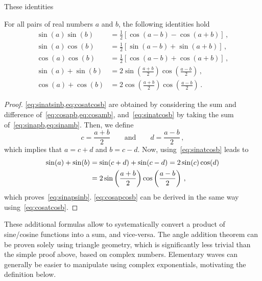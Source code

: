 These identities
\begin{corollary}
  \label{cor:sumproduct}
  For all pairs of real numbers $a$ and $b$, the following identities hold
  \begin{align}
    \sin(a)\sin(b)&=\frac{1}{2}\left[\cos(a-b)-\cos(a+b)\right]\,,
    \label{eq:sinatsinb}\\
    \sin(a)\cos(b)&=\frac{1}{2}\left[\sin(a-b)+\sin(a+b)\right]\,,
    \label{eq:sinatcosb}\\
    \cos(a)\cos(b)&=\frac{1}{2}\left[\cos(a-b)+\cos(a+b)\right]\,,
    \label{eq:cosatcosb}\\
    \sin(a)+\sin(b)&=2\sin\left(\frac{a+b}{2}\right)\cos\left(\frac{a-b}{2}\right)\,,
    \label{eq:sinapsinb}\\
    \cos(a)+\cos(b)&=2\cos\left(\frac{a+b}{2}\right)\cos\left(\frac{a-b}{2}\right)\,.
    \label{eq:cosapcosb}
  \end{align}
\end{corollary}
\begin{proof}
  \cref{eq:sinatsinb,eq:cosatcosb} are obtained by considering the sum and difference of~\cref{eq:cosapb,eq:cosamb}, and~\cref{eq:sinatcosb} by taking the sum of~\cref{eq:sinapb,eq:sinamb}.
  Then, we define
  \begin{equation}
    c=\frac{a+b}{2}\qquad\text{and}\qquad d=\frac{a-b}{2}\,,
  \end{equation}
  which implies that $a=c+d$ and $b=c-d$. Now, using~\cref{eq:sinatcosb} leads to
  \begin{align}
    \sin(a)+\sin(b)&=\sin(c+d)+\sin(c-d)=2\sin(c)\cos(d)\notag\\
    &=2\sin\left(\frac{a+b}{2}\right)\cos\left(\frac{a-b}{2}\right)\,,
  \end{align}
  which proves~\cref{eq:sinapsinb}. \cref{eq:cosapcosb} can be derived in the same way using~\cref{eq:cosatcosb}.
\end{proof}
These additional formulas allow to systematically convert a product of sine/cosine
functions into a sum, and vice-versa. The angle addition theorem can be proven solely
using triangle geometry, which is significantly less trivial than the simple proof above,
based on complex numbers. Elementary waves can generally be easier to manipulate using
complex exponentials, motivating the definition below.
